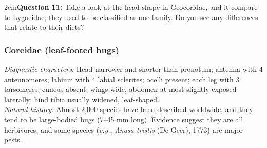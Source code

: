 \documentclass[letterpaper, 11pt]{article}
\begin{document}
\hangindent2em\textbf{Question 11:} Take a look at the head shape in Geocoridae, and it compare to Lygaeidae; they used to be classified as one family. Do you see any differences that relate to their diets?\\

\subsubsection{Coreidae (leaf-footed bugs)}
\noindent{}\textit{Diagnostic characters:} Head narrower and shorter than pronotum; antenna with 4 antennomeres; labium with 4 labial sclerites; ocelli present; each leg with 3 tarsomeres; cuneus absent; wings wide, abdomen at most slightly exposed laterally; hind tibia usually widened, leaf-shaped.\\

\noindent{}\textit{Natural history:} Almost 2,000 species have been described worldwide, and they tend to be large-bodied bugs (7--45 mm long). Evidence suggest they are all herbivores, and some species (\textit{e.g.}, \textit{Anasa tristis} (De Geer), 1773) are major pests.\\
\end{document}
